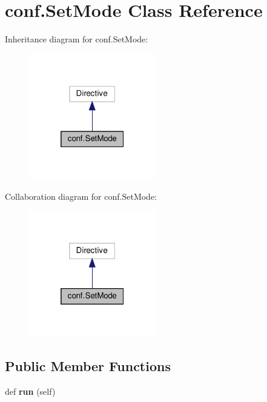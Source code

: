 \hypertarget{classconf_1_1SetMode}{}\section{conf.\+Set\+Mode Class Reference}
\label{classconf_1_1SetMode}


Inheritance diagram for conf.\+Set\+Mode\+:
\nopagebreak
\begin{figure}[H]
\begin{center}
\leavevmode
\includegraphics[width=157pt]{classconf_1_1SetMode__inherit__graph}
\end{center}
\end{figure}


Collaboration diagram for conf.\+Set\+Mode\+:
\nopagebreak
\begin{figure}[H]
\begin{center}
\leavevmode
\includegraphics[width=157pt]{classconf_1_1SetMode__coll__graph}
\end{center}
\end{figure}
\subsection*{Public Member Functions}
\begin{DoxyCompactItemize}
\item 
\mbox{\label{classconf_1_1SetMode_ac3e12cb0da9b23a8e299fbd202fa9253}} 
def {\bfseries run} (self)
\end{DoxyCompactItemize}
